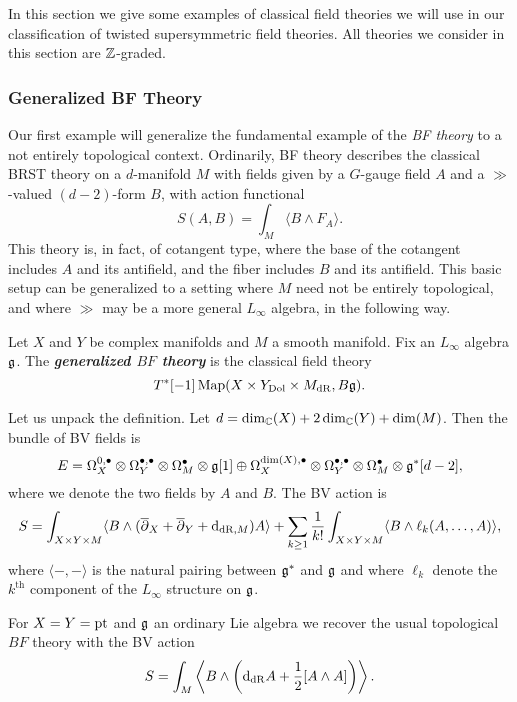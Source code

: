 \documentclass[10pt, oneside]{article}
\newcommand{\defterm}[1]{\textbf{\emph{#1}}}
\begin{document}
In this section we give some examples of classical field theories we will use in our classification of twisted supersymmetric field theories. All theories we consider in this section are $\mathbb Z$-graded.

\subsubsection{Generalized BF Theory} \label{gen_BF_section}

Our first example will generalize the fundamental example of the \emph{BF theory} to a not entirely topological context.  Ordinarily, BF theory describes the classical BRST theory on a $d$-manifold $M$ with fields given by a $G$-gauge field $A$ and a $\gg$-valued $(d-2)$-form $B$, with action functional
\[S(A,B) = \int_M \langle B \wedge F_A \rangle.\]
This theory is, in fact, of cotangent type, where the base of the cotangent includes $A$ and its antifield, and the fiber includes $B$ and its antifield.  This basic setup can be generalized to a setting where $M$ need not be entirely topological, and where $\gg$ may be a more general $L_\infty$ algebra, in the following way.

\begin{definition}
Let $X$ and $Y$ be complex manifolds and $M$ a smooth manifold. Fix an $L_\infty$ algebra $\mathfrak g$. The \defterm{generalized $BF$ theory} is the classical field theory
\[T^*[-1]\operatorname{Map}(X\times Y_{\mathrm{Dol}}\times M_{\mathrm{dR}}, B\mathfrak g).\]
\label{def:generalizedBF}
\end{definition}

Let us unpack the definition. Let $d = \dim_\mathbb C(X) + 2\dim_\mathbb C(Y) + \dim(M)$. Then the bundle of BV fields is
\[E = \Omega^{0,\bullet}_X \otimes \Omega^{\bullet,\bullet}_Y \otimes \Omega^\bullet_M \otimes \mathfrak g[1]\oplus \Omega^{\dim(X),\bullet}_X \otimes \Omega^{\bullet,\bullet}_Y \otimes \Omega^\bullet_M\otimes \mathfrak g^*[d-2],\]
where we denote the two fields by $A$ and $B$. The BV action is
\[S = \int_{X\times Y\times M} \langle B\wedge (\overline{\partial}_X + \overline{\partial}_Y + {\rm d}_{\mathrm{dR}, M}) A\rangle + \sum_{k\geq 1}\frac{1}{k!} \int_{X\times Y\times M} \langle B\wedge \ell_k(A, \dots, A)\rangle,\]
where $\langle -, -\rangle$ is the natural pairing between $\mathfrak g^*$ and $\mathfrak g$ and where $\ell_k$ denote the $k^{\text{th}}$ component of the $L_\infty$ structure on $\mathfrak g$.

\begin{example}
For $X=Y=\operatorname{pt}$ and $\mathfrak g$ an ordinary Lie algebra we recover the usual topological $BF$ theory with the BV action
\[S = \int_M \left\langle B\wedge \left({\rm d}_{\mathrm{dR}} A+ \frac{1}{2}[A\wedge A]\right)\right\rangle.\]
\end{example}
\end{document}
